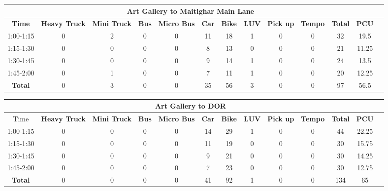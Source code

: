 \begin{landscape}
\centering
\begin{table}[h!]
\centering
\begin{tabular}{|c|c|c|c|c|c|c|c|c|c|c|c|c|}
    \hline
    \multicolumn{12}{|c|}{\textbf{Art Gallery to Maitighar Main Lane}} \\
    \hline
    \textbf{Time} & \textbf{Heavy Truck} & \textbf{Mini Truck} & \textbf{Bus} & \textbf{Micro Bus} & \textbf{Car} & \textbf{Bike} & \textbf{LUV} & \textbf{Pick up} & \textbf{Tempo} & \textbf{\textbf{Total}} & \textbf{PCU} \\
    \hline
1:00-1:15	&0	&2	&0	&0	&11	&18	&1	&0	&0	&32	&19.5 \\ \hline
1:15-1:30	&0	&0	&0	&0	&8	&13	&0	&0	&0	&21	&11.25 \\ \hline
1:30-1:45	&0	&0	&0	&0	&9	&14	&1	&0	&0	&24	&13.5 \\ \hline
1:45-2:00	&0	&1	&0	&0	&7	&11	&1	&0	&0	&20	&12.25 \\ \hline
\textbf{Total}	&0	&3	&0	&0	&35	&56	&3	&0	&0	&97	&56.5 \\ \hline

\end{tabular}

\vspace{0.5cm}

\begin{tabular}{|c|c|c|c|c|c|c|c|c|c|c|c|c|}
    \hline
    \multicolumn{12}{|c|}{\textbf{Art Gallery to DOR}} \\
    \hline
        Time & \textbf{Heavy Truck} & \textbf{Mini Truck} & \textbf{Bus} & \textbf{Micro Bus} & \textbf{Car} & \textbf{Bike} & \textbf{LUV} & \textbf{Pick up} & \textbf{Tempo} & \textbf{\textbf{Total}} & \textbf{PCU} \\
    \hline
1:00-1:15	&0	&0	&0	&0	&14	&29	&1	&0	&0	&44	&22.25 \\ \hline
1:15-1:30	&0	&0	&0	&0	&11	&19	&0	&0	&0	&30	&15.75 \\ \hline
1:30-1:45	&0	&0	&0	&0	&9	&21	&0	&0	&0	&30	&14.25 \\ \hline
1:45-2:00	&0	&0	&0	&0	&7	&23	&0	&0	&0	&30	&12.75 \\ \hline
\textbf{Total}	&0	&0	&0	&0	&41	&92	&1	&0	&0	&134	&65 \\ \hline

\end{tabular}


\end{table}
\end{landscape}
